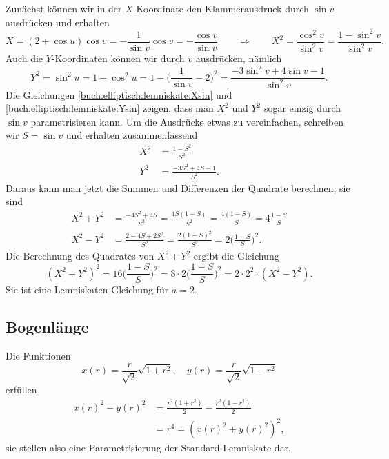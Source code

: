 Zunächst können wir in der $X$-Koordinate den Klammerausdruck durch
$\sin v$ ausdrücken und erhalten
\begin{equation}
X
=
(2+\cos u) \cos v
=
-\frac{1}{\sin v}\cos v
=
-\frac{\cos v}{\sin v}
\qquad\Rightarrow\qquad
X^2
=
\frac{\cos^2v}{\sin^2 v}
=
\frac{1-\sin^2v}{\sin^2 v}.
\label{buch:elliptisch:lemniskate:Xsin}
\end{equation}
Auch die $Y$-Koordinaten können wir durch $v$ ausdrücken, 
nämlich
\begin{equation}
Y^2=\sin^2 u = 1-\cos^2 u
=
1-
\biggl(
\frac{1}{\sin v}
-2
\biggr)^2
=
\frac{-3\sin^2 v+4\sin v-1}{\sin^2 v}.
\label{buch:elliptisch:lemniskate:Ysin}
\end{equation}
Die Gleichungen
\eqref{buch:elliptisch:lemniskate:Xsin}
und
\eqref{buch:elliptisch:lemniskate:Ysin}
zeigen, dass man $X^2$ und $Y^2$ sogar einzig durch $\sin v$ 
parametrisieren kann.
Um die Ausdrücke etwas zu vereinfachen, schreiben wir $S=\sin v$
und erhalten zusammenfassend
\begin{equation}
\begin{aligned}
X^2
&=
\frac{1-S^2}{S^2}
\\
Y^2
&=
\frac{-3S^2+4S-1}{S^2}.
\end{aligned}
\end{equation}
Daraus kann man jetzt die Summen und Differenzen der Quadrate
berechnen, sie sind
\begin{equation}
\begin{aligned}
X^2+Y^2
&=
\frac{-4S^2+4S}{S^2}
=
\frac{4S(1-S)}{S^2}
=
\frac{4(1-S)}{S}
=
4\frac{1-S}{S}
\\
X^2-Y^2
&=
\frac{2-4S+2S^2}{S^2}
=
\frac{2(1-S)^2}{S^2}
=
2\biggl(\frac{1-S}{S}\biggr)^2.
\end{aligned}
\end{equation}
Die Berechnung des Quadrates von $X^2+Y^2$ ergibt die Gleichung
\[
(X^2+Y^2)^2
=
16
\biggl(\frac{1-S}{S}\biggr)^2
=
8 \cdot 2
\biggl(\frac{1-S}{S}\biggr)^2
=
2\cdot 2^2\cdot (X^2-Y^2).
\]
Sie ist eine Lemniskaten-Gleichung für $a=2$.

%
%
\subsection{Bogenlänge}
Die Funktionen
\begin{equation}
x(r) = \frac{r}{\!\sqrt{2}}\sqrt{1+r^2},
\quad
y(r) = \frac{r}{\!\sqrt{2}}\sqrt{1-r^2}
\label{buch:geometrie:eqn:lemniskateparam}
\end{equation}
erfüllen
\begin{align*}
x(r)^2-y(r)^2
&=
\frac{r^2(1+r^2)}{2}-\frac{r^2(1-r^2)}{2}
\\
&
=
r^4
=
(x(r)^2 + y(r)^2)^2,
\end{align*}
sie stellen also eine Parametrisierung der Standard-Lemniskate dar.

